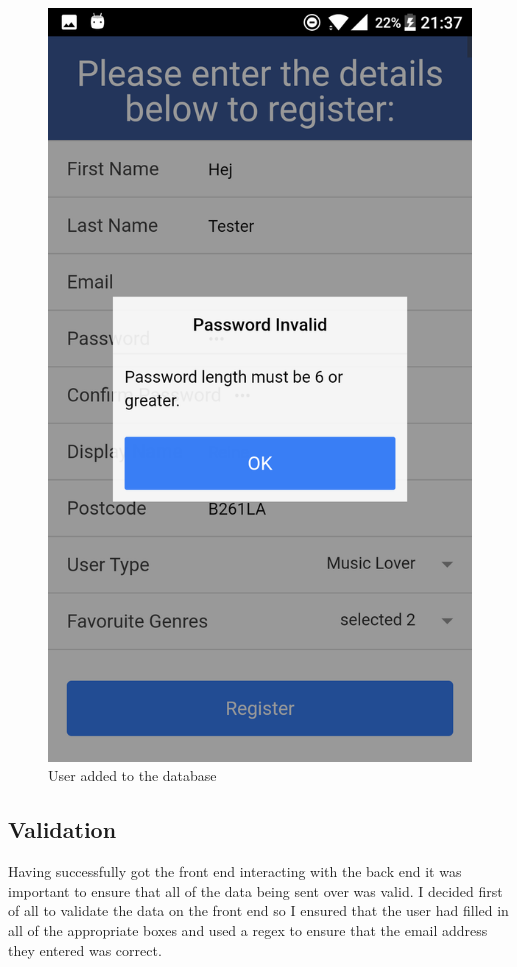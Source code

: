 \begin{figure}[H]
\includegraphics[scale=0.15]{images/sc5}
\caption{User added to the database}
\end{figure}

\subsection{Validation}
Having successfully got the front end interacting with the back end it was important to ensure that all of the data being sent over was valid. I decided first of all to validate the data on the front end so I ensured that the user had filled in all of the appropriate boxes and used a regex to ensure that the email address they entered was correct.

